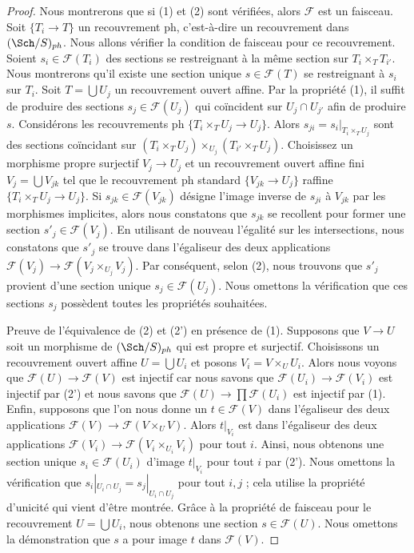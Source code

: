 \begin{proof}
Nous montrerons que si (1) et (2) sont vérifiées, alors $\mathcal{F}$ est un faisceau. Soit $\{T_i \to T\}$ un recouvrement ph, c'est-à-dire un recouvrement dans $(\Sch/S)_{ph}$. Nous allons vérifier la condition de faisceau pour ce recouvrement. Soient $s_i \in \mathcal{F}(T_i)$ des sections se restreignant à la même section sur $T_i \times_T T_{i'}$. Nous montrerons qu'il existe une section unique $s \in \mathcal{F}(T)$ se restreignant à $s_i$ sur $T_i$. Soit $T = \bigcup U_j$ un recouvrement ouvert affine. Par la propriété (1), il suffit de produire des sections $s_j \in \mathcal{F}(U_j)$ qui coïncident sur $U_j \cap U_{j'}$ afin de produire $s$. Considérons les recouvrements ph $\{T_i \times_T U_j \to U_j\}$. Alors $s_{ji} = s_i|_{T_i \times_T U_j}$ sont des sections coïncidant sur $(T_i \times_T U_j) \times_{U_j} (T_{i'} \times_T U_j)$. Choisissez un morphisme propre surjectif $V_j \to U_j$ et un recouvrement ouvert affine fini $V_j = \bigcup V_{jk}$ tel que le recouvrement ph standard $\{V_{jk} \to U_j\}$ raffine $\{T_i \times_T U_j \to U_j\}$. Si $s_{jk} \in \mathcal{F}(V_{jk})$ désigne l'image inverse de $s_{ji}$ à $V_{jk}$ par les morphismes implicites, alors nous constatons que $s_{jk}$ se recollent pour former une section $s'_j \in \mathcal{F}(V_j)$. En utilisant de nouveau l'égalité sur les intersections, nous constatons que $s'_j$ se trouve dans l'égaliseur des deux applications $\mathcal{F}(V_j) \to \mathcal{F}(V_j \times_{U_j} V_j)$. Par conséquent, selon (2), nous trouvons que $s'_j$ provient d'une section unique $s_j \in \mathcal{F}(U_j)$. Nous omettons la vérification que ces sections $s_j$ possèdent toutes les propriétés souhaitées.

\medskip\noindent
Preuve de l'équivalence de (2) et (2') en présence de (1). Supposons que $V \to U$ soit un morphisme de $(\Sch/S)_{ph}$ qui est propre et surjectif. Choisissons un recouvrement ouvert affine $U = \bigcup U_i$ et posons $V_i = V \times_U U_i$. Alors nous voyons que $\mathcal{F}(U) \to \mathcal{F}(V)$ est injectif car nous savons que $\mathcal{F}(U_i) \to \mathcal{F}(V_i)$ est injectif par (2') et nous savons que $\mathcal{F}(U) \to \prod \mathcal{F}(U_i)$ est injectif par (1). Enfin, supposons que l'on nous donne un $t \in \mathcal{F}(V)$ dans l'égaliseur des deux applications $\mathcal{F}(V) \to \mathcal{F}(V \times_U V)$. Alors $t|_{V_i}$ est dans l'égaliseur des deux applications $\mathcal{F}(V_i) \to \mathcal{F}(V_i \times_{U_i} V_i)$ pour tout $i$. Ainsi, nous obtenons une section unique $s_i \in \mathcal{F}(U_i)$ d'image $t|_{V_i}$ pour tout $i$ par (2'). Nous omettons la vérification que $s_i|_{U_i \cap U_j} = s_j|_{U_i \cap U_j}$ pour tout $i, j$ ; cela utilise la propriété d'unicité qui vient d'être montrée. Grâce à la propriété de faisceau pour le recouvrement $U = \bigcup U_i$, nous obtenons une section $s \in \mathcal{F}(U)$. Nous omettons la démonstration que $s$ a pour image $t$ dans $\mathcal{F}(V)$.
\end{proof}


